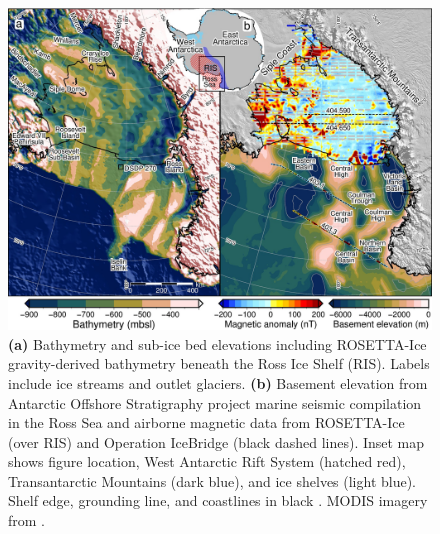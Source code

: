 \begin{figure}
    \includegraphics[width=\textwidth]{figures/chp2/Fig1_Bathy_Mag.jpg}
    \caption[Bathymetry, magnetics, and acoustic basement]{\textbf{(a)} Bathymetry and sub-ice bed elevations \citep{morlighemdeep2020} including ROSETTA-Ice gravity-derived bathymetry \citep{tintoross2019} beneath the Ross Ice Shelf (RIS). Labels include ice streams and outlet glaciers. \textbf{(b)} Basement elevation from Antarctic Offshore Stratigraphy project marine seismic compilation in the Ross Sea \citet{brancolinidescriptive1995} and airborne magnetic data from ROSETTA-Ice (over RIS) and Operation IceBridge (black dashed lines). Inset map shows figure location, West Antarctic Rift System (hatched red), Transantarctic Mountains (dark blue), and ice shelves (light blue). Shelf edge, grounding line, and coastlines in black \citep{rignoticeshelf2013}. MODIS imagery from \citet{scambosmodisbased2007}.}
    \label{fig:chp2_Bathy_Mag}
\end{figure}

